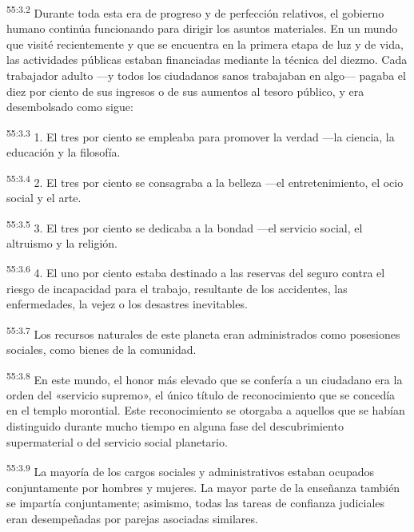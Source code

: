 \par
\textsuperscript{55:3.2} Durante toda esta era de progreso y de perfección relativos, el gobierno humano continúa funcionando para dirigir los asuntos materiales. En un mundo que visité recientemente y que se encuentra en la primera etapa de luz y de vida, las actividades públicas estaban financiadas mediante la técnica del diezmo. Cada trabajador adulto ---y todos los ciudadanos sanos trabajaban en algo--- pagaba el diez por ciento de sus ingresos o de sus aumentos al tesoro público, y era desembolsado como sigue:

\par
\textsuperscript{55:3.3} 1. El tres por ciento se empleaba para promover la verdad ---la ciencia, la educación y la filosofía.

\par
\textsuperscript{55:3.4} 2. El tres por ciento se consagraba a la belleza ---el entretenimiento, el ocio social y el arte.

\par
\textsuperscript{55:3.5} 3. El tres por ciento se dedicaba a la bondad ---el servicio social, el altruismo y la religión.

\par
\textsuperscript{55:3.6} 4. El uno por ciento estaba destinado a las reservas del seguro contra el riesgo de incapacidad para el trabajo, resultante de los accidentes, las enfermedades, la vejez o los desastres inevitables.

\par
\textsuperscript{55:3.7} Los recursos naturales de este planeta eran administrados como posesiones sociales, como bienes de la comunidad.

\par
\textsuperscript{55:3.8} En este mundo, el honor más elevado que se confería a un ciudadano era la orden del «servicio supremo», el único título de reconocimiento que se concedía en el templo morontial. Este reconocimiento se otorgaba a aquellos que se habían distinguido durante mucho tiempo en alguna fase del descubrimiento supermaterial o del servicio social planetario.

\par
\textsuperscript{55:3.9} La mayoría de los cargos sociales y administrativos estaban ocupados conjuntamente por hombres y mujeres. La mayor parte de la enseñanza también se impartía conjuntamente; asimismo, todas las tareas de confianza judiciales eran desempeñadas por parejas asociadas similares.

